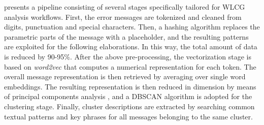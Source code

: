  presents a pipeline consisting of several stages specifically tailored for WLCG analysis workflows. 
First, the error messages are tokenized and cleaned from digits, punctuation and special characters.
Then, a hashing algorithm replaces the parametric parts of the message with a placeholder, and the resulting patterns are exploited for the following elaborations. In this way, the total amount of data is reduced by 90-95\%.
After the above pre-processing, the vectorization stage is based on \textit{word2vec} \cite{mikolov2013word2vec} that computes a numerical representation for each token. The overall message representation is then retrieved by averaging over single word embeddings. 
The resulting representation is then reduced in dimension by means of principal components analysis \cite{wold1987pca}, and a DBSCAN \cite{ester1996dbscan} algorithm is adopted for the clustering stage.
Finally, cluster descriptions are extracted by searching common textual patterns and key phrases for all messages belonging to the same cluster.


